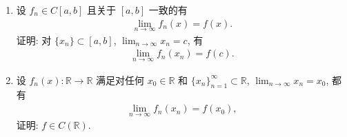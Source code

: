 \documentclass[../../main.tex]{subfiles}%
\begin{document}
\begin{proposition}
\begin{enumerate}
\item 设 \(f_n\in C[a,b]\) 且关于 \([a,b]\) 一致的有
\begin{align*}
\lim_{n \to \infty}f_n(x)=f(x).
\end{align*}
证明: 对 \(\{x_n\}\subset [a,b]\), \(\lim_{n \to \infty}x_n = c\), 有
\begin{align*}
\lim_{n \to \infty}f_n(x_n)=f(c).
\end{align*}

\item 设 \(f_n(x):\mathbb{R}\to\mathbb{R}\) 满足对任何 \(x_0\in\mathbb{R}\) 和 \(\{x_n\}_{n = 1}^{\infty}\subset\mathbb{R}\), \(\lim_{n \to \infty}x_n = x_0\), 都有
\begin{align*}
\lim_{n \to \infty}f_n(x_n)=f(x_0),
\end{align*}
证明: \(f\in C(\mathbb{R})\). 
\end{enumerate}
\end{proposition}
\end{document}
